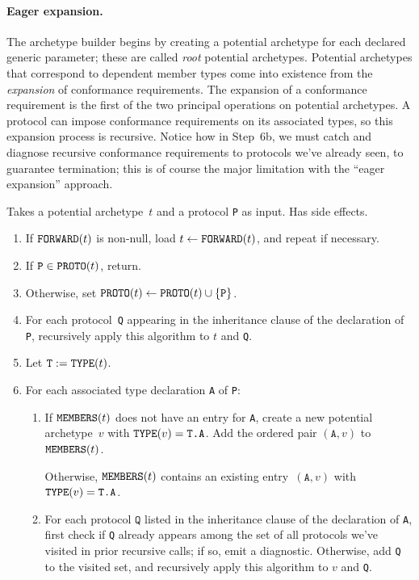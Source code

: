 \documentclass[../generics]{subfiles}
\begin{document}
\paragraph{Eager expansion.}
The archetype builder begins by creating a potential archetype for each declared generic parameter; these are called \emph{root} potential archetypes. Potential archetypes that correspond to dependent member types come into existence from the \emph{expansion} of conformance requirements. The expansion of a conformance requirement is the first of the two principal operations on potential archetypes. A protocol can impose conformance requirements on its associated types, so this expansion process is recursive. Notice how in Step~6b, we must catch and diagnose recursive conformance requirements to protocols we've already seen, to guarantee termination; this is of course the major limitation with the ``eager expansion'' approach.

\begin{algorithm}\label{archetype builder expand}
Takes a potential archetype~$t$ and a protocol \texttt{P} as input. Has side effects.
\begin{enumerate}
\item If $\texttt{FORWARD}(t)$ is non-null, load $t\leftarrow\texttt{FORWARD}(t)$, and repeat if necessary.
\item If $\texttt{P}\in\texttt{PROTO}(t)$, return.
\item Otherwise, set $\texttt{PROTO}(t)\leftarrow \texttt{PROTO}(t)\cup\{\texttt{P}\}$.
\item For each protocol~\texttt{Q} appearing in the inheritance clause of the declaration of \texttt{P}, recursively apply this algorithm to $t$ and \texttt{Q}.
\item Let $\texttt{T}:=\texttt{TYPE}(t)$.
\item For each associated type declaration \texttt{A} of \texttt{P}:
\begin{enumerate}
\item If $\texttt{MEMBERS}(t)$ does not have an entry for \texttt{A}, create a new potential archetype~$v$ with $\texttt{TYPE}(v)=\texttt{T.A}$. Add the ordered pair $(\texttt{A}, v)$ to $\texttt{MEMBERS}(t)$.

Otherwise, $\texttt{MEMBERS}(t)$ contains an existing entry~$(\texttt{A}, v)$ with $\texttt{TYPE}(v)=\texttt{T.A}$.
\item For each protocol $\texttt{Q}$ listed in the inheritance clause of the declaration of \texttt{A}, first check if \texttt{Q} already appears among the set of all protocols we've visited in prior recursive calls; if so, emit a diagnostic. Otherwise, add \texttt{Q} to the visited set, and recursively apply this algorithm to $v$ and \texttt{Q}.
\end{enumerate}
\end{enumerate}
\end{algorithm}
\end{document}
